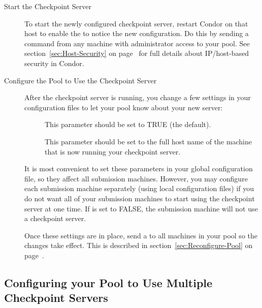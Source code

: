 \begin{description}
\begin{description}
\end{description}

\item[Start the Checkpoint Server]

To start the newly configured checkpoint server,
restart Condor on that host to enable
the  to notice the new configuration.
Do this by sending a  command from any machine
with administrator access to your pool.
See section~\ref{sec:Host-Security} on
page~\pageref{sec:Host-Security} for full details about IP/host-based
security in Condor.

\item[Configure the Pool to Use the Checkpoint Server]

After the checkpoint server is running, you
change a few settings in your configuration files to let your pool know
about your new server:

\begin{description}
   \item[] This parameter should be set to
   TRUE (the default).

   \item[] This parameter should be set to
   the full host name of the machine that is now running your checkpoint
   server.  
\end{description}

It is most convenient to set these parameters in your global configuration file,
so they affect all submission machines.
However, you may configure each submission machine separately (using
local configuration files) if you do not want all of your submission machines
to start using the checkpoint server at one time.
If  is set to FALSE, the
submission machine will not use a checkpoint server.

Once these settings are in place, send a
 to all machines in your pool so the changes take
effect.
This is described in section~\ref{sec:Reconfigure-Pool} on
page~\pageref{sec:Reconfigure-Pool}.

\end{description}

\subsection{\label{Configure-Multiple-Ckpt-Server} 
Configuring your Pool to Use Multiple Checkpoint Servers}

